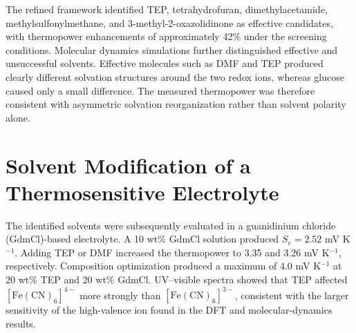 The refined framework identified TEP, tetrahydrofuran, dimethylacetamide,
methylsulfonylmethane, and 3-methyl-2-oxazolidinone as effective candidates,
with thermopower enhancements of approximately 42\% under the screening
conditions. Molecular dynamics simulations further distinguished effective
and unsuccessful solvents. Effective molecules such as DMF and TEP produced
clearly different solvation structures around the two redox ions, whereas
glucose caused only a small difference. The measured thermopower was therefore
consistent with asymmetric solvation reorganization rather than solvent
polarity alone.

\section{Solvent Modification of a Thermosensitive Electrolyte}

The identified solvents were subsequently evaluated in a guanidinium chloride
(GdmCl)-based electrolyte. A 10 wt\% GdmCl solution produced
$S_e=2.52$ mV K$^{-1}$. Adding TEP or DMF increased the thermopower to
3.35 and 3.26 mV K$^{-1}$, respectively. Composition optimization produced a
maximum of 4.0 mV K$^{-1}$ at 20 wt\% TEP and 20 wt\% GdmCl.
UV--visible spectra showed that TEP affected
$[\mathrm{Fe(CN)}_6]^{4-}$ more strongly than
$[\mathrm{Fe(CN)}_6]^{3-}$, consistent with the larger sensitivity of the
high-valence ion found in the DFT and molecular-dynamics results.


